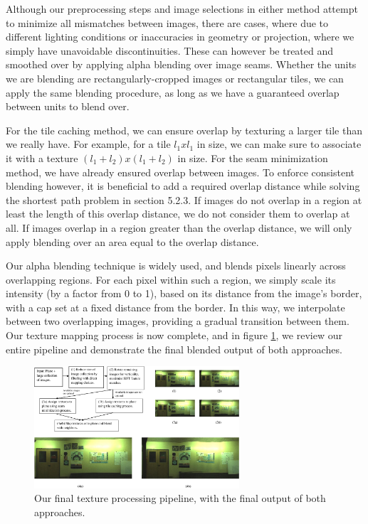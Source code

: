 \documentclass[10pt,twocolumn,letterpaper]{article}
\begin{document}
Although our preprocessing steps and image selections in either method
attempt to minimize all mismatches between images, there are cases,
where due to different lighting conditions or inaccuracies in geometry
or projection, where we simply have unavoidable discontinuities. These
can however be treated and smoothed over by applying alpha blending
over image seams.  Whether the units we are blending are
rectangularly-cropped images or rectangular tiles, we can apply the
same blending procedure, as long as we have a guaranteed overlap
between units to blend over.

For the tile caching method, we can ensure overlap by texturing a
larger tile than we really have. For example, for a tile $l_1 x l_1$
in size, we can make sure to associate it with a texture $(l_1 + l_2)
x (l_1 + l_2)$ in size. For the seam minimization method, we have
already ensured overlap between images. To enforce consistent blending
however, it is beneficial to add a required overlap distance while
solving the shortest path problem in section 5.2.3. If images do not
overlap in a region at least the length of this overlap distance, we
do not consider them to overlap at all. If images overlap in a region
greater than the overlap distance, we will only apply blending over an
area equal to the overlap distance.

Our alpha blending technique is widely used, and blends pixels
linearly across overlapping regions. For each pixel within such a
region, we simply scale its intensity (by a factor from 0 to 1), based
on its distance from the image's border, with a cap set at a fixed
distance from the border. In this way, we interpolate between two
overlapping images, providing a gradual transition between them. Our
texture mapping process is now complete, and in figure
\ref{fig:pipeline}, we review our entire pipeline and demonstrate the
final blended output of both approaches.

\begin{figure}
  \centering
  \includegraphics[width=3in]{pipeline.pdf}
  \caption{Our final texture processing pipeline, with the final
    output of both approaches.}
  \label{fig:pipeline}
\end{figure}
\end{document}
